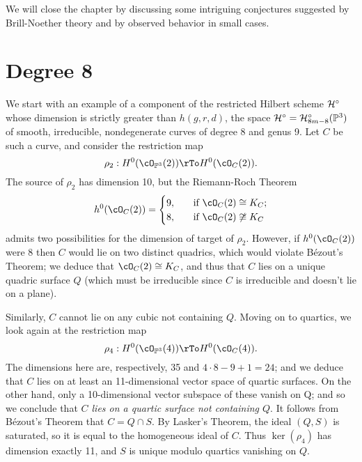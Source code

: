 
We will close the chapter by discussing some intriguing conjectures suggested by Brill-Noether theory and by observed behavior in small cases.


\section{Degree 8}\label{degree 8 section}

We start with an example of a component of the restricted Hilbert scheme $\cH^\circ$ whose dimension is strictly greater than $h(g,r,d)$, the space $\cH^\circ = \cH^\circ_{8m-8}(\PP^3)$ of smooth, irreducible, nondegenerate curves of degree 8 and genus 9. Let $C$ be such a curve, and consider the restriction map
$$
\rho_2 : H^0(\cO_{\PP^3}(2)) \rTo H^0(\cO_C(2)).
$$
The source of $\rho_2$ has dimension 10, but the Riemann-Roch Theorem
\begin{align*}
h^0(\cO_C(2)) =
\begin{cases}
9, \quad &\text{if } \cO_C(2) \cong K_C; \\
8,  \quad &\text{if } \cO_C(2) \not\cong K_C
\end{cases}
\end{align*}
admits two possibilities for the dimension of target of $\rho_2$.
However, if $h^0(\cO_C(2))$ were 8 then $C$ would  lie on two distinct quadrics, which would violate B\'ezout's Theorem; we deduce that $\cO_C(2) \cong K_C$, and thus that $C$ lies on a unique quadric surface $Q$ (which must be irreducible since $C$ is irreducible and doesn't lie on a plane).

Similarly, $C$ cannot lie on any cubic not containing $Q$. Moving on to quartics, we look again at the restriction map
$$
\rho_4 : H^0(\cO_{\PP^3}(4)) \rTo H^0(\cO_C(4)).
$$
The dimensions here are, respectively, 35 and $4\cdot 8 - 9 + 1 = 24$; and we deduce that $C$ lies on at least an 11-dimensional vector space of quartic surfaces. On the other hand, only a 10-dimensional vector subspace of these vanish on Q; and so we conclude that \emph{$C$ lies on a quartic surface not containing $Q$}. It follows from B\'ezout's Theorem that $C = Q \cap S$. By Lasker's Theorem, the ideal $(Q,S)$ is saturated, so it is equal to the homogeneous ideal of $C$. Thus $\ker(\rho_4)$ has dimension exactly 11, and  $S$ is unique modulo quartics vanishing on $Q$.


